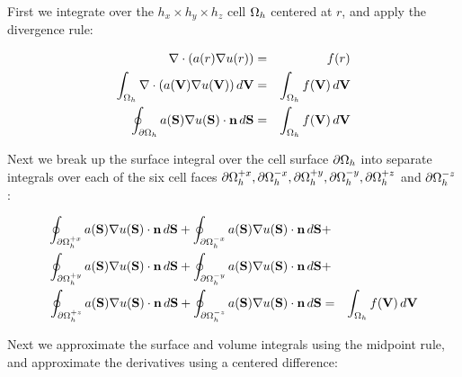 \documentclass[10pt]{article}
\begin{document}
\begin{center}
\begin{minipage}{1.5in}
\end{minipage} 
\end{center}

First we integrate over the $h_x \times h_y \times h_z$ cell ${\Omega_h}$
centered at $r$, and apply the divergence rule:

 \begin{eqnarray*}
 \nabla\cdot(a(r) \nabla u(r)) & = & f(r) \\
 \int_{\Omega_h} \nabla\cdot(a(\textbf{V}) \nabla u(\textbf{V}))\, d\textbf{V} & = & \int_{\Omega_h} f(\textbf{V})\, d\textbf{V} \\
 \oint_{\partial{\Omega_h}} a(\textbf{S}) \nabla u(\textbf{S})\cdot \textbf{n} \, d\textbf{S} & = & \int_{\Omega_h} f(\textbf{V})\, d\textbf{V}
 \end{eqnarray*}

Next we break up the surface integral over the cell surface $\partial{\Omega_h}$
into separate integrals over each of the six cell faces
$\partial\Omega_h^{+x},\partial\Omega_h^{-x},\partial\Omega_h^{+y},\partial\Omega_h^{-y},\partial\Omega_h^{+z}$ and $\partial\Omega_h^{-z}$:

 \begin{eqnarray*}
 \oint_{\partial\Omega_h^{+x}} a(\textbf{S}) \nabla u(\textbf{S})\cdot \textbf{n} \, d\textbf{S} +  \oint_{\partial\Omega_h^{-x}} a(\textbf{S}) \nabla u(\textbf{S})\cdot \textbf{n} \, d\textbf{S} & + & \\
 \oint_{\partial\Omega_h^{+y}} a(\textbf{S}) \nabla u(\textbf{S})\cdot \textbf{n} \, d\textbf{S} +  \oint_{\partial\Omega_h^{-y}} a(\textbf{S}) \nabla u(\textbf{S})\cdot \textbf{n} \, d\textbf{S} & + & \\
 \oint_{\partial\Omega_h^{+z}} a(\textbf{S}) \nabla u(\textbf{S})\cdot \textbf{n} \, d\textbf{S} +  \oint_{\partial\Omega_h^{-z}} a(\textbf{S}) \nabla u(\textbf{S})\cdot \textbf{n} \, d\textbf{S} & = & \int_{\Omega_h} f(\textbf{V})\, d\textbf{V}
 \end{eqnarray*}

Next we approximate the surface and volume integrals using the
midpoint rule, and approximate the derivatives using a centered difference:
\end{document}
